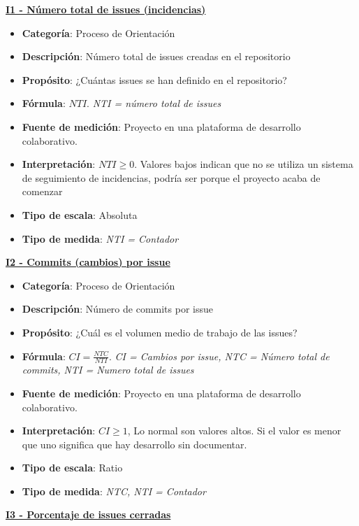 \textbf{\underline{I1 - Número total de issues (incidencias)}}
\begin{itemize}
	\tightlist
	\item \textbf{Categoría}: Proceso de Orientación
	\item \textbf{Descripción}: Número total de issues creadas en el repositorio
	\item \textbf{Propósito}: ¿Cuántas issues se han definido en el repositorio?
	\item \textbf{Fórmula}: $NTI$. \textit{NTI = número total de issues}
	\item \textbf{Fuente de medición}: Proyecto en una plataforma de desarrollo colaborativo.
	\item \textbf{Interpretación}: $NTI \geq 0$. Valores bajos indican que no se utiliza un sistema de seguimiento de incidencias, podría ser porque el proyecto acaba de comenzar
	\item \textbf{Tipo de escala}: Absoluta
	\item \textbf{Tipo de medida}: \textit{NTI = Contador}
\end{itemize}
\textbf{\underline{I2 - Commits (cambios) por issue}}
\begin{itemize}
	\tightlist
	\item \textbf{Categoría}: Proceso de Orientación
	\item \textbf{Descripción}: Número de commits por issue
	\item \textbf{Propósito}: ¿Cuál es el volumen medio de trabajo de las issues?
	\item \textbf{Fórmula}: $CI = \frac{NTC}{NTI}$. \textit{CI = Cambios por issue, NTC = Número total de commits, NTI = Numero total de issues}
	\item \textbf{Fuente de medición}: Proyecto en una plataforma de desarrollo colaborativo.
	\item \textbf{Interpretación}: $CI \geq 1$, Lo normal son valores altos. Si el valor es menor que uno significa que hay desarrollo sin documentar.
	\item \textbf{Tipo de escala}: Ratio 
	\item \textbf{Tipo de medida}: \textit{NTC, NTI = Contador}
\end{itemize}
\textbf{\underline{I3 - Porcentaje de issues cerradas}}
